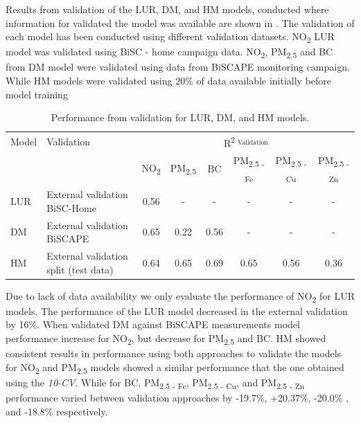 \documentclass{article}
\begin{document}
Results from validation of the LUR, DM, and HM models, conducted where information for validated the model was available are shown in . The validation of each model has been conducted using different validation datasets. NO\textsubscript{2} LUR model was validated using BiSC - home campaign data. NO\textsubscript{2}, PM\textsubscript{2.5} and BC from DM model were validated using data from BiSCAPE monitoring campaign. While HM models were validated using 20\% of data available initially before model training

\begin{table}[h!]
\centering
    \caption{Performance from validation for LUR, DM, and HM models.}
    \label{table2}
    \begin{tabular}{llcccccc}
    \toprule
         Model & Validation & \multicolumn{6}{c}{R\textsuperscript{2 \textsubscript{ Validation}}} \\
         \cmidrule(lr){3-8}
         & & NO\textsubscript{2} & PM\textsubscript{2.5} & BC & PM\textsubscript{2.5 - Fe} & PM\textsubscript{2.5 - Cu} & PM\textsubscript{2.5 - Zn} \\
    \midrule
         LUR & External validation BiSC-Home & 0.56 & - & - & - & - & - \\
         DM & External validation BiSCAPE & 0.65 & 0.22 & 0.56 & - & - & - \\
         HM & External validation split (test data) & 0.64 & 0.65 & 0.69 & 0.65 & 0.56 & 0.36  \\
    \bottomrule
    \end{tabular}
\end{table}

Due to lack of data availability we only evaluate the performance of NO\textsubscript{2} for LUR models. The performance of the LUR model decreased in the external validation by 16\%. When validated DM against BiSCAPE measurements model performance increase for NO\textsubscript{2}, but decrease for PM\textsubscript{2.5} and BC. HM showed consistent results in performance using both approaches to validate the models for NO\textsubscript{2} and PM\textsubscript{2.5} models showed a similar performance that the one obtained using the \textit{10-CV}. While for BC, PM\textsubscript{2.5 - Fe}, PM\textsubscript{2.5 - Cu}, and PM\textsubscript{2.5 - Zn} performance varied between validation approaches by -19.7\%, +20.37\%, -20.0\% , and -18.8\% respectively. 

\newpage
\end{document}
